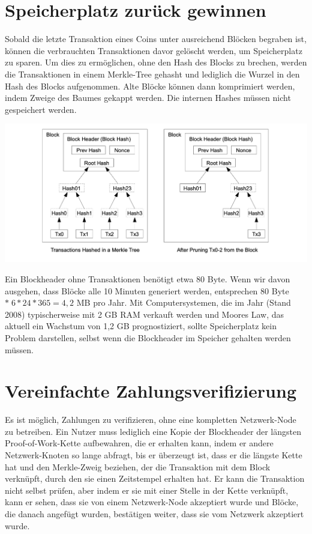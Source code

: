 \documentclass[9pt]{article}
\begin{document}
	\section{Speicherplatz zurück gewinnen}
	
	Sobald die letzte Transaktion eines Coins unter ausreichend Blöcken begraben ist, können die verbrauchten Transaktionen davor gelöscht werden, um Speicherplatz zu sparen. Um dies zu ermöglichen, ohne den Hash des Blocks zu brechen, werden die Transaktionen in einem Merkle-Tree \cite{merkle}\cite{massias}\cite{haber2} gehasht und lediglich die Wurzel in den Hash des Blocks aufgenommen. Alte Blöcke können dann komprimiert werden, indem Zweige des Baumes gekappt werden. Die internen Hashes müssen nicht gespeichert werden.
	
	\begin{center}
		\includegraphics[scale=0.3]{pics/reclaimingdiskspace.png}
	\end{center}
	
	Ein Blockheader ohne Transaktionen benötigt etwa 80 Byte. Wenn wir davon ausgehen, dass Blöcke alle 10 Minuten generiert werden, entsprechen 80 Byte $* \;6 * 24 * 365 = 4,2$ MB pro Jahr. Mit Computersystemen, die im Jahr (Stand 2008) typischerweise mit 2 GB RAM verkauft werden und Moores Law, das aktuell ein Wachstum von 1,2 GB prognostiziert, sollte Speicherplatz kein Problem darstellen, selbst wenn die Blockheader im Speicher gehalten werden müssen.
	
	\newpage
	
	\section{Vereinfachte Zahlungsverifizierung}
	
	Es ist möglich, Zahlungen zu verifizieren, ohne eine kompletten Netzwerk-Node zu betreiben. Ein Nutzer muss lediglich eine Kopie der Blockheader der längsten Proof-of-Work-Kette aufbewahren, die er erhalten kann, indem er andere Netzwerk-Knoten so lange abfragt, bis er überzeugt ist, dass er die längste Kette hat und den Merkle-Zweig beziehen, der die Transaktion mit dem Block verknüpft, durch den sie einen Zeitstempel erhalten hat. Er kann die Transaktion nicht selbst prüfen, aber indem er sie mit einer Stelle in der Kette verknüpft, kann er sehen, dass sie von einem Netzwerk-Node akzeptiert wurde und Blöcke, die danach angefügt wurden, bestätigen weiter, dass sie vom Netzwerk akzeptiert wurde.
	
\end{document}

